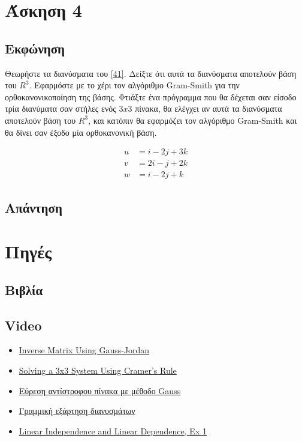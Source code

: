 \documentclass[12pt]{extreport}
\begin{document}
\chapter{Άσκηση 4}
\section{Εκφώνηση}

Θεωρήστε τα διανύσματα του \eqref{41}. Δείξτε ότι αυτά τα διανύσματα αποτελούν βάση του $R^{3}$. Εφαρμόστε με το χέρι τον αλγόριθμο Gram-Smith για την ορθοκανονικοποίηση της βάσης. Φτιάξτε ένα πρόγραμμα που θα δέχεται σαν είσοδο τρία διανύματα σαν στήλες ενός $3x3$ πίνακα, θα ελέγχει αν αυτά τα διανύσματα αποτελούν βάση του $R^{3}$, και κατόπιν θα εφαρμόζει τον αλγόριθμο Gram-Smith και θα δίνει σαν έξοδο μία ορθοκανονική βάση.

\begin{equation}
    \begin{aligned}
        u & = i - 2j + 3k \\
        v & = 2i - j + 2k \\
        w & = i - 2j + k
    \end{aligned}\label{41}
\end{equation}

\newpage
\section{Απάντηση}

\chapter{Πηγές}
\newpage


\section{Βιβλία}
\section{Video}
\begin{itemize}
    \item \href{https://www.youtube.com/watch?v=cJg2AuSFdjw}{Inverse Matrix Using Gauss-Jordan}
    \item \href{https://youtu.be/X5rDjbp0t6s}{Solving a 3x3 System Using Cramer's Rule}
    \item \href{https://youtu.be/0vB1sgebS9c}{Εύρεση αντίστροφου πίνακα με μέθοδο Gauss}
    \item \href{https://youtu.be/Gmt1fmlrEto}{Γραμμική εξάρτηση διανυσμάτων}
    \item \href{https://youtu.be/yLi8RxqfowA}{Linear Independence and Linear Dependence, Ex 1}
\end{itemize}
\end{document}
